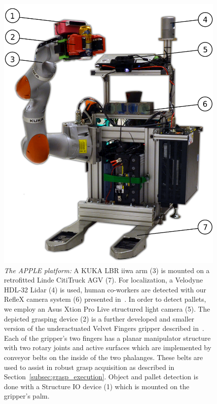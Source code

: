 \begin{figure}[t!]
\begin{center}
\includegraphics[width =0.8\linewidth]{figs/apple_demonstrator}
\caption{\textit{The APPLE platform:} A KUKA LBR iiwa arm (3) is mounted on a retrofitted Linde
  CitiTruck AGV (7). For localization, a Velodyne HDL-32 Lidar (4) is used, human co-workers are
  detected with our RefleX camera system (6) presented in~\cite{Mosb14}. In order to detect pallets,
  we employ an Asus Xtion Pro Live structured light camera (5). The depicted grasping device (2) is
  a further developed and smaller version of the underactuated Velvet Fingers gripper described
  in~\cite{Tinc12}. Each of the gripper’s two fingers has a planar manipulator structure with two
  rotary joints and active surfaces which are implemented by conveyor belts on the inside of the two
  phalanges. These belts are used to assist in robust grasp acquisition as described in
  Section~\ref{subsec:grasp_execution}. Object and pallet detection is done with a Structure IO
  device (1) which is mounted on the gripper's palm.}
\label{fig:robot}
\vspace{-0.65cm}
\end{center}
\end{figure}

